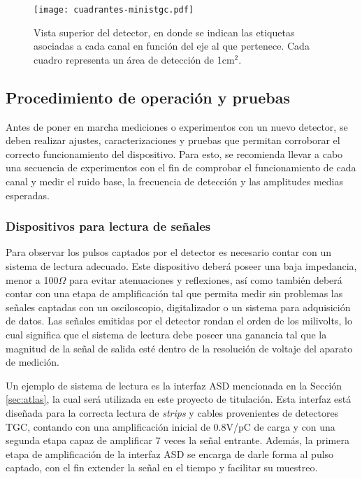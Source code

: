	\begin{figure}[h]
		\centering
		\texttt{[image: cuadrantes-ministgc.pdf]}
		\caption{Vista superior del detector, en donde se indican las etiquetas asociadas a cada canal en función del eje al que pertenece. Cada cuadro representa un área de detección de 1cm$^2$.}
		\label{img:cuadrantes-ministgc}
	\end{figure}

\subsection{Procedimiento de operación y pruebas}
	Antes de poner en marcha mediciones o experimentos con un nuevo detector, se deben realizar ajustes, caracterizaciones y pruebas que permitan corroborar el correcto funcionamiento del dispositivo. Para esto, se recomienda llevar a cabo una secuencia de experimentos con el fin de comprobar el funcionamiento de cada canal y medir el ruido base, la frecuencia de detección y las amplitudes medias esperadas.

	\subsubsection{Dispositivos para lectura de señales}
		Para observar los pulsos captados por el detector es necesario contar con un sistema de lectura adecuado. Este dispositivo deberá poseer una  baja impedancia, menor a 100$\Omega$ para evitar atenuaciones y reflexiones, así como también deberá contar con una etapa de amplificación tal que permita medir sin problemas las señales captadas con un osciloscopio, digitalizador o un sistema para adquisición de datos. Las señales emitidas por el detector rondan el orden de los milivolts, lo cual significa que el sistema de lectura debe poseer una ganancia tal que la magnitud de la señal de salida esté dentro de la resolución de voltaje del aparato de medición.
		
		Un ejemplo de sistema de lectura es la interfaz ASD mencionada en la Sección \ref{sec:atlas}, la cual será utilizada en este proyecto de titulación. Esta interfaz está diseñada para la correcta lectura de \textit{strips} y cables provenientes de detectores TGC, contando con una amplificación inicial de 0.8V/pC de carga y con una segunda etapa capaz de amplificar 7 veces la señal entrante. Además, la primera etapa de amplificación de la interfaz ASD se encarga de darle forma al pulso captado, con el fin extender la señal en el tiempo y facilitar su muestreo.
		
